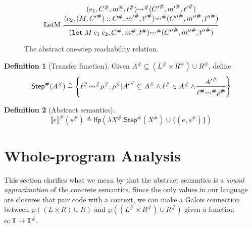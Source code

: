 \documentclass[acmsmall,review]{acmart}\settopmatter{printfolios=true,printccs=false,printacmref=false}
\theoremstyle{definition}
\newtheorem{definition}{Definition}[section]
\newcommand*{\cons}{::}
\newcommand*{\A}[1]{{#1}^{\#}}
\newcommand*{\Time}{\mathbb{T}}
\newcommand*{\ATime}{\A{\Time}}
\newcommand*{\mem}{m}
\newcommand*{\semarrow}{\rightsquigarrow}
\newcommand*{\sembracket}[1]{\lBrack{#1}\rBrack}
\begin{document}
\begin{figure}[h!]
  \[
    \begin{prooftree}
      \hypo{
        \begin{matrix}
          (e_{1}, \A{C}, \A\mem, \A{t})
          \A\semarrow
          (\A{C'}, \A{\mem'}, \A{t'}) \\
          (e_{2}, (M, \A{C'})\cons \A{C}, \A{\mem'}, \A{t'})
          \A\semarrow
          (\A{C''}, \A{\mem''}, \A{t''})
        \end{matrix}
      }
      \infer[left label=LetM]1{
      (\mathtt{let}\:M\:e_{1}\:e_{2}, \A{C}, \A\mem, \A{t})
      \A\semarrow
      (\A{C''}, \A{\mem''}, \A{t''})
      }
    \end{prooftree}
  \]
  \caption{The abstract one-step reachability relation.}
  \label{fig:absreach}
\end{figure}

\begin{definition}[Transfer function]
  Given $\A{A}\subseteq (\A{L}\times \A{R})\cup\A{R}$, define
  \[
    \A{\mathsf{Step}}(\A{A})\triangleq
    \left\{\A\ell\A\semarrow\A\rho,\A\rho|
    \A{A'}\subseteq \A{A}\wedge\A{\ell}\in \A{A}\wedge
    \begin{prooftree}[center=true]
      \hypo{\A{A'}}\infer1{\A\ell\A\semarrow\A\rho}
    \end{prooftree}\right\}
  \]
\end{definition}
\begin{definition}[Abstract semantics]
  \[
    \A{\sembracket{e}}(\A{s})\triangleq\mathsf{lfp}(\lambda \A{X}.\A{\mathsf{Step}}(\A{X})\cup\{(e,\A{s})\})
  \]
\end{definition}

\section{Whole-program Analysis}
This section clarifies what we mean by that the abstract semantics is a \emph{sound approximation} of the concrete semantics.
Since the only values in our language are closures that pair code with a context, we can make a Galois connection between $\wp((L\times R)\cup R)$ and $\wp((\A{L}\times\A{R})\cup\A{R})$ given a function $\alpha:\Time\rightarrow\ATime$.
\end{document}
